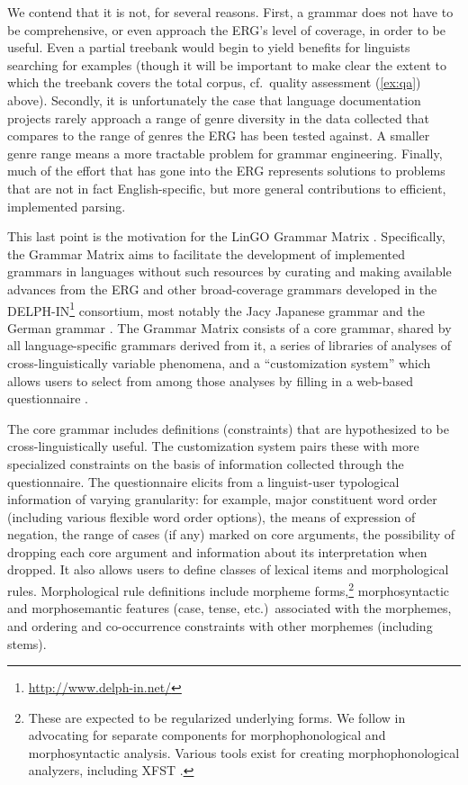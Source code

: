 We contend that it is not, for several reasons.  First, a grammar does
not have to be comprehensive, or even approach the ERG's level of
coverage, in order to be useful.  Even a partial treebank would begin to
yield benefits for linguists searching for examples (though it will be
important to make clear the extent to which the treebank covers the
total corpus, cf.\ {\sc quality assessment} (\ref{ex:qa}) above).
Secondly, it is unfortunately the case that language documentation
projects rarely approach a range of genre diversity in the data
collected that compares to the range of genres the ERG has been tested
against.  A smaller genre range means a more tractable problem for
grammar engineering.  Finally, much of the effort that has gone into the
ERG represents solutions to problems that are not in fact
English-specific, but more general contributions to efficient, implemented \hpsg
parsing.

This last point is the motivation for the LinGO Grammar Matrix
\citep{Ben:Fli:Oep:02,Ben:Dre:Fok:Pou:Sal:10}.  Specifically, the
Grammar Matrix aims to facilitate the development of implemented
grammars in languages without such resources by curating and making
available advances from the ERG and other broad-coverage grammars
developed in the DELPH-IN\footnote{\url{http://www.delph-in.net/}}
consortium, most notably the Jacy Japanese grammar \citep{Sie:Ben:02}
and the German grammar \citep{mueller-s-kasper-w00}.  The Grammar
Matrix consists of a core grammar, shared by all language-specific
grammars derived from it, a series of libraries of analyses of
cross-linguistically variable phenomena, and a ``customization
system'' which allows users to select from among those analyses by
filling in a web-based questionnaire \citep[cf][]{Blacktv}.

The core grammar includes definitions (constraints) that are
hypothesized to be cross-linguistically useful.  The customization
system pairs these with more specialized constraints on the basis of
information collected through the questionnaire. The questionnaire
elicits from a linguist-user typological information of varying
granularity: for example, major constituent word order (including
various flexible word order options), the means of expression of
negation, the range of cases (if any) marked on core arguments, the
possibility of dropping each core argument and information about its interpretation when
dropped.  It also allows users to define classes of lexical items and
morphological rules.  Morphological rule definitions include morpheme
forms,\footnote{These are expected to be regularized underlying forms.
  We follow  in advocating for separate
  components for morphophonological and morphosyntactic analysis.
  Various tools exist for creating morphophonological analyzers,
  including XFST \citep{Bee:Kar:03}.} morphosyntactic and
morphosemantic features (case, tense, etc.)\ associated with the
morphemes, and ordering and co-occurrence constraints with other
morphemes (including stems).

